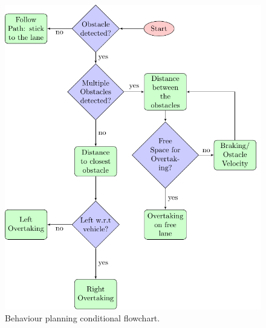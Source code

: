 \documentclass[conference, 11pt]{IEEEtran}
\begin{document}
\begin{figure}[H]
	\centering
	\includegraphics[width=1\columnwidth]{./figure/flowchart/flowchart.pdf}
	\vspace{-20pt}
	\caption{Behaviour planning conditional flowchart.}
	\label{fig:flowchart}
\end{figure}
\end{document}
